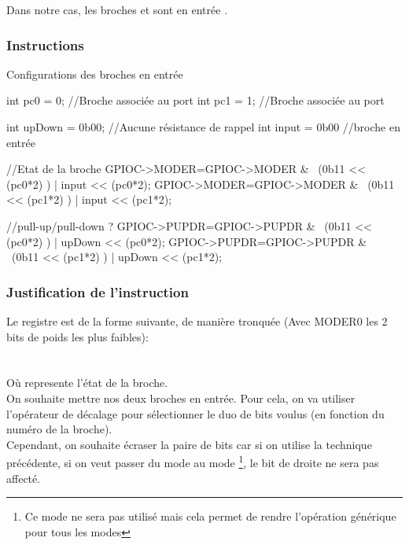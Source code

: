 {\begin{itemize}
  Dans notre cas, les broches  et  sont en entrée .

\end{itemize}

\subsubsection{Instructions}

  \begin{Cpp}{Configurations des broches en entrée}

  int pc0 = 0;                //Broche associée au port
  int pc1 = 1;                //Broche associée au port

  int upDown = 0b00;   //Aucune résistance de rappel
  int input = 0b00     //broche en entrée

  //Etat de la broche
  GPIOC->MODER=GPIOC->MODER & ~(0b11 << (pc0*2) ) | input << (pc0*2); 
  GPIOC->MODER=GPIOC->MODER & ~(0b11 << (pc1*2) ) | input << (pc1*2);

  //pull-up/pull-down ?
  GPIOC->PUPDR=GPIOC->PUPDR & ~(0b11 << (pc0*2) ) | upDown << (pc0*2);
  GPIOC->PUPDR=GPIOC->PUPDR & ~(0b11 << (pc1*2) ) | upDown << (pc1*2);

\end{Cpp}

\subsubsection{Justification de l'instruction}

Le registre  est de la forme suivante, de manière tronquée (Avec MODER0 les 2 bits de poids les plus faibles): \\
   \\
\quad\quad\quad{} \quad\quad\quad{}\quad\quad\quad{}    \quad\quad{}\\


Où  represente l'état de la broche.\\

On souhaite mettre nos deux broches en entrée. Pour cela, on va utiliser l'opérateur de décalage pour sélectionner le duo de bits voulus (en fonction du numéro de la broche). \\

Cependant, on souhaite écraser la paire de bits car si on utilise la technique précédente, si on veut passer du mode   au mode \footnote{Ce mode ne sera pas utilisé mais cela permet de rendre l'opération générique pour tous les modes}, le bit de droite ne sera pas affecté.\\

}
